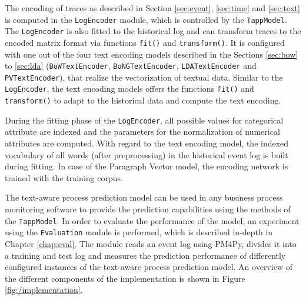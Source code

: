 The encoding of traces as described in Section \ref{sec:event}, \ref{sec:time} and \ref{sec:text} is computed in the \texttt{LogEncoder} module, which is controlled by the \texttt{TappModel}.
The \texttt{LogEncoder} is also fitted to the historical log and can transform traces to the encoded matrix format via functions \texttt{fit()} and \texttt{transform()}.
It is configured with one out of the four text encoding models described in the Sections \ref{sec:bow} to \ref{sec:lda} (\texttt{BoWTextEncoder},  \texttt{BoNGTextEncoder}, \texttt{LDATextEncoder} and  \texttt{PVTextEncoder}), that realize the vectorization of textual data.
Similar to the \texttt{LogEncoder}, the text encoding models offers the functions \texttt{fit()} and \texttt{transform()} to adapt to the historical data and compute the text encoding.

During the fitting phase of the  \texttt{LogEncoder}, all possible values for categorical attribute are indexed and the parameters for the normalization of numerical attributes are computed.
With regard to the text encoding model, the indexed vocabulary of all words (after preprocessing) in the historical event log is built during fitting.
In case of the Paragraph Vector model, the encoding network is trained with the training corpus.

The text-aware process prediction model can be used in any business process monitoring software to provide the prediction capabilities using the methods of the \texttt{TappModel}.
In order to evaluate the performance of the model, an experiment using the \texttt{Evaluation} module is performed, which is described in-depth in Chapter \ref{chap:eval}.
The module reads an event log using PM4Py, divides it into a training and test log and measures the prediction performance of differently configured instances of the text-aware process prediction model.
An overview of the different components of the implementation is shown in Figure \ref{fig:/implementation}.
